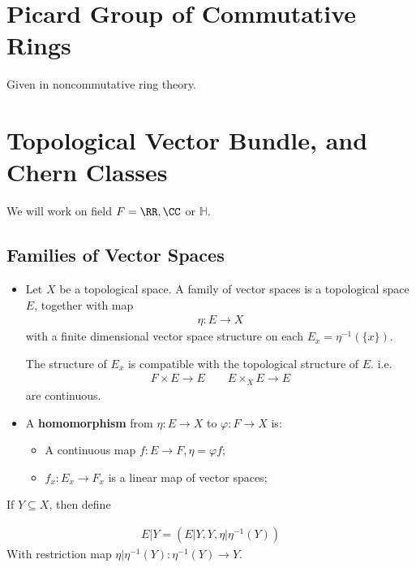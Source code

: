 \documentclass[Total.tex]{subfiles}
\begin{document}
	\section{Picard Group of Commutative Rings}
	
	Given in noncommutative ring theory.
	
	\section{Topological Vector Bundle, and Chern Classes}
	
	We will work on field $F=\RR,\CC$ or $\mathbb{H}$.
	
	\subsection{Families of Vector Spaces}
	
	\begin{Def}
		\begin{itemize}
			\item Let $X$ be a topological space. A family of vector spaces is a topological space $E$, together with map
			\begin{gather*}
				\eta:E\rightarrow X
			\end{gather*}
			with a finite dimensional vector space structure on each $E_x=\eta^{-1}(\{x\})$. 
			
			The structure of $E_x$ is compatible with the topological structure of $E$. i.e.
			\begin{gather*}
				F\times E\rightarrow E\qquad E\times_X E\rightarrow E
			\end{gather*}
			are continuous.
			
			\item  A \textbf{homomorphism} from $\eta:E\rightarrow X$ to $\varphi:F\rightarrow X$ is:
			
			\begin{itemize}
				\item A continuous map $f:E\rightarrow F,\eta=\varphi f$;
				\item $f_x:E_x\rightarrow F_x$ is a linear map of vector spaces;
			\end{itemize}
		\end{itemize}
	\end{Def}
	
	
	
	If $Y\subseteq X$, then define
	
	\begin{gather*}
		E|Y=(E|Y,Y,\eta|\eta^{-1}(Y))
	\end{gather*}
	With restriction map $\eta|\eta^{-1}(Y):\eta^{-1}(Y)\rightarrow Y$. 
	
\end{document}
